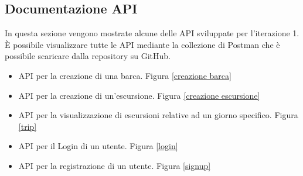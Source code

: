 \subsection{Documentazione API}
In questa sezione vengono mostrate alcune delle API sviluppate per l'iterazione 1. È possibile visualizzare tutte le API mediante la collezione di Postman che è possibile scaricare dalla repository su GitHub.  
\begin{itemize}
    \item API per la creazione di una barca. Figura \ref{creazione barca}
    \item API per la creazione di un'escursione. Figura \ref{creazione escursione}
    \item API per la visualizzazione di escursioni relative ad un giorno specifico. Figura \ref{trip} 
    \item API per il Login di un utente. Figura \ref{login}
    \item API per la registrazione di un utente. Figura \ref{signup}
\end{itemize}

